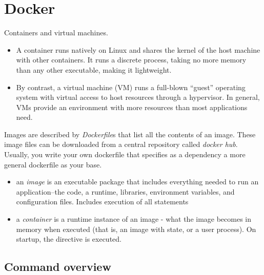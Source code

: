\section{Docker}

Containers and virtual machines.
\begin{itemize}
    \item A container runs natively on Linux and shares the kernel of the host machine with other containers. It runs a discrete process, taking no more memory than any other executable, making it lightweight.
    \item By contrast, a virtual machine (VM) runs a full-blown “guest” operating system with virtual access to host resources through a hypervisor. In general, VMs provide an environment with more resources than most applications need.
\end{itemize}

Images are described by \emph{Dockerfile}s that list all the contents of an image. These image files can be downloaded from a central repository called \emph{docker hub}.
Usually, you write your own dockerfile that specifies as a dependency a more general dockerfile as your base. 
\begin{itemize}
    \item an \emph{image} is an executable package that includes everything needed to run an application--the code, a runtime, libraries, environment variables, and configuration files. Includes execution of all  statements
    \item a \emph{container} is a runtime instance of an image - what the image becomes in memory when executed (that is, an image with state, or a user process). On startup, the  directive is executed.
\end{itemize}


\subsection{Command overview}

